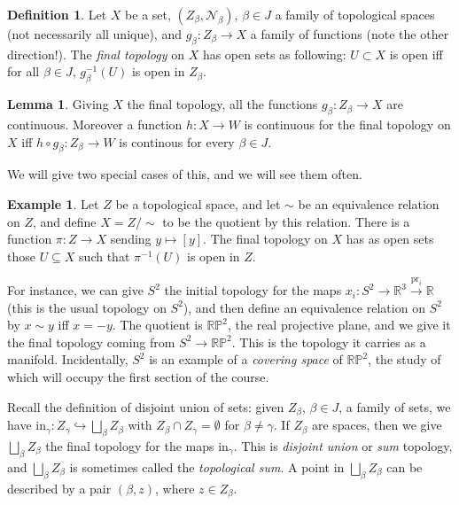 \documentclass{tufte-handout}
\def\into {\hookrightarrow}
\def\cN {\mathcal{N}}
\def\RR{\mathbb{R}}
\DeclareMathOperator{\pr}{pr}
\theoremstyle{definition}
\newtheorem{lemma}{Lemma}
\newtheorem{definition}{Definition}
\newtheorem{example}{Example}
\begin{document}
\begin{definition} 
Let $X$ be a set, $(Z_\beta,\cN_\beta)$, $\beta \in J$ a family of topological spaces 
(not necessarily all unique), and $g_\beta\colon Z_\beta\to X$ a family of 
functions (note the other direction!). The \emph{final topology} on $X$ has open sets as 
following: $U\subset X$ is open iff for all $\beta\in J$, $g_\beta^{-1}(U)$ is open in 
$Z_\beta$. 
\end{definition}

\begin{lemma} 
Giving $X$ the final topology, all the functions $g_\beta\colon Z_\beta\to X$ 
are continuous. Moreover a function $h\colon X\to W$ is continuous for the final topology on 
$X$ iff $h\circ g_\beta\colon Z_\beta\to W$ is continous for every $\beta\in J$. 
\end{lemma}

We will give two special cases of this, and we will see them often.

\begin{example} 
Let $Z$ be a topological space, and let $\sim$ be an equivalence 
relation on $Z$, and define $X = Z/\!\sim$ to be the quotient by this relation. There is a 
function $ \pi\colon Z\to X$ sending $y\mapsto [y]$. The final topology on $X$ has as open 
sets those $U\subseteq X$ such that $\pi^{-1}(U)$ is open in $Z$. 
\end{example}

For instance, we can give $S^2$ the initial topology for the maps $x_i\colon S^2 \to \RR^3 
\xrightarrow{\pr_i} \RR$ (this is the usual topology on $S^2$), and then define an equivalence relation on 
$S^2$ by $x\sim y$ iff $x = - y$. The quotient is $\mathbb{RP}^2$, the real projective 
plane, and we give it the final topology coming from $S^2\to \mathbb{RP}^2$. This is the 
topology it carries as a manifold. Incidentally, $S^2$ is an example of a \emph{covering 
space} of $\mathbb{RP}^2$, the study of which will occupy the first section of the course.


Recall the definition of disjoint union of sets: given $Z_\beta$, 
 $\beta\in J$, a family of sets, we have $\mathrm{in}_\gamma \colon Z_\gamma \into 
 \bigsqcup_{\beta} Z_\beta$ with $Z_\beta \cap Z_\gamma = \emptyset$ for $\beta\neq \gamma$. 
 If $Z_\beta$ are spaces, then we give $\bigsqcup_{\beta} Z_\beta$ the final topology for 
 the maps $\mathrm{in}_\gamma$. This is \emph{disjoint union} or \emph{sum} 
topology, and $\bigsqcup_{\beta} Z_\beta$ is sometimes called the 
\emph{topological sum}. A point in $\bigsqcup_{\beta} Z_\beta$ can be described by a pair 
$(\beta,z)$, where $z \in Z_\beta$.
\end{document}
